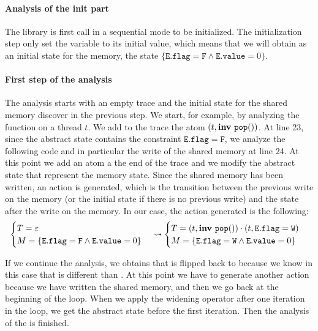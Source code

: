 \paragraph{Analysis of the init part} 

The library is first call in a sequential mode to be initialized. The initialization step only set the variable  to its initial value, which means that we will obtain as an initial state for the memory, the state $\{\mathtt{E.flag} = \mathtt{F} \wedge \mathtt{E.value} = 0\}$.


\paragraph{First step of the analysis}

The analysis starts with an empty trace and the initial state for the shared memory discover in the previous step. We start, for example, by analyzing the  function on a thread $t$. We add to the trace the atom $(t, \mathbf{inv}\ \mathtt{pop}())$. At line 23, since the abstract state contains the constraint $\mathtt{E.flag} = \mathtt{F}$, we analyze the following code and in particular the write of the shared memory at line 24. 
At this point we add an atom a the end of the trace and we modify the abstract state that represent the memory state. Since the shared memory has been written, an action is generated, which is the transition between the previous write on the memory (or the initial state if there is no previous write) and the state after the write on the memory. 
In our case, the action generated is the following:
\[\begin{cases}
	T = \varepsilon\\
	M = \{\mathtt{E.flag} = \mathtt{F} \wedge \mathtt{E.value} = 0\}
\end{cases} \leadsto
\begin{cases}
	T = (t, \mathbf{inv}\ \mathtt{pop}()) \cdot (t, \mathtt{E.flag} = \mathtt{W})\\
	M = \{\mathtt{E.flag} = \mathtt{W} \wedge \mathtt{E.value} = 0\}
\end{cases}\]

If we continue the analysis, we obtains that  is flipped back to  because we know in this case that  is different than . At this point we have to generate another action because we have written the shared memory, and then we go back at the beginning of the loop. 
When we apply the widening operator after one iteration in the loop, we get the abstract state before the first iteration. Then the analysis of the  is finished. 

